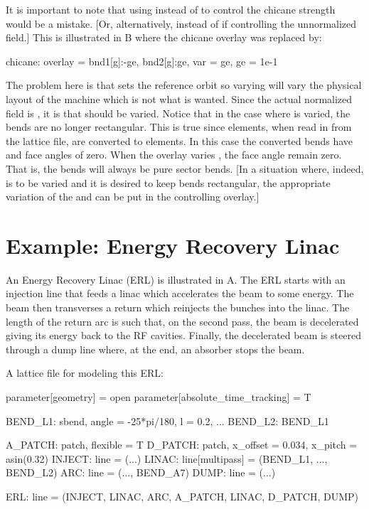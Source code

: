 It is important to note that using  instead of  to control the chicane strength
would be a mistake. [Or, alternatively,  instead of  if controlling the
unnormalized field.] This is illustrated in B where the chicane overlay was replaced
by:
\begin{example}
  chicane: overlay = {bnd1[g]:-ge, bnd2[g]:ge}, var = {ge}, ge = 1e-1
\end{example}
The problem here is that  sets the reference orbit so varying  will vary the physical
layout of the machine which is not what is wanted. Since the actual normalized field is , it is  that should be varied. Notice that in the case where  is varied, the
bends are no longer rectangular. This is true since  elements, when read in from the
lattice file, are converted to  elements. In this case the converted bends have 
and  face angles of zero. When the  overlay varies , the face angle remain
zero. That is, the bends will always be pure sector bends. [In a situation where, indeed,  is
to be varied and it is desired to keep bends rectangular, the appropriate variation of the 
and  can be put in the controlling overlay.]

\section{Example: Energy Recovery Linac}
\label{s:ex.erl}

An Energy Recovery Linac (ERL) is illustrated in A. The ERL starts with an injection line
that feeds a linac which accelerates the beam to some energy. The beam then transverses a return
 which reinjects the bunches into the linac. The length of the return arc is such that, on
the second pass, the beam is decelerated giving its energy back to the RF cavities. Finally, the
decelerated beam is steered through a dump line where, at the end, an absorber stops the beam.

 A lattice file for modeling this ERL:
\begin{example}
  parameter[geometry] = open
  parameter[absolute_time_tracking] = T

  BEND_L1: sbend, angle = -25*pi/180, l = 0.2, ...
  BEND_L2: BEND_L1

  A_PATCH: patch, flexible = T
  D_PATCH: patch, x_offset = 0.034, x_pitch = asin(0.32) 
  INJECT: line = (...)
  LINAC: line[multipass] = (BEND_L1, ..., BEND_L2)
  ARC: line = (..., BEND_A7)
  DUMP: line = (...)

  ERL: line = (INJECT, LINAC, ARC, A_PATCH, LINAC, D_PATCH, DUMP)
\end{example}


